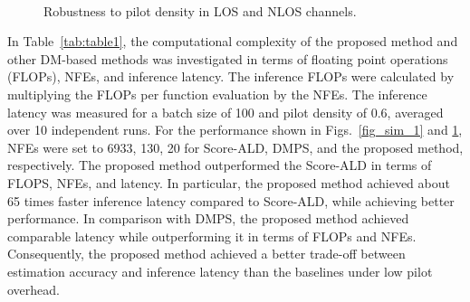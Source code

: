 \documentclass[lettersize,journal]{IEEEtran}
\begin{document}
\begin{figure}[!t]
\\
\caption{Robustness to pilot density in LOS and NLOS channels.}
\label{fig_sim_2}
\end{figure}

In Table~\ref{tab:table1}, the computational complexity of the proposed method and other DM-based methods was investigated in terms of floating point operations (FLOPs), NFEs, and inference latency. The inference FLOPs were calculated by multiplying the FLOPs per function evaluation by the NFEs. The inference latency was measured for a batch size of 100 and pilot density of 0.6, averaged over 10 independent runs. For the performance shown in Figs.~\ref{fig_sim_1} and \ref{fig_sim_2}, NFEs were set to 6933, 130, 20 for Score-ALD, DMPS, and the proposed method, respectively. The proposed method outperformed the Score-ALD in terms of FLOPS, NFEs, and latency. In particular, the proposed method achieved about 65 times faster inference latency compared to Score-ALD, while achieving better performance. In comparison with DMPS, the proposed method achieved comparable latency while outperforming it in terms of FLOPs and NFEs. Consequently, the proposed method achieved a better trade-off between estimation accuracy and inference latency than the baselines under low pilot overhead.
\end{document}
